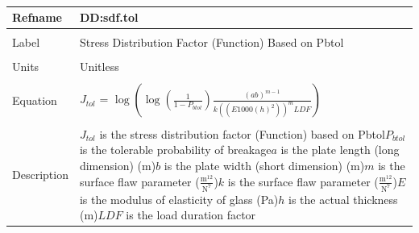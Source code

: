 \documentclass[12pt]{article}
\begin{document}
~\newline
\noindent \begin{minipage}{\textwidth}
\begin{tabular}{p{} p{}}
\toprule \textbf{Refname} & \textbf{DD:sdf.tol}
\label{DD:sdf.tol}
\\ \midrule \\
Label & Stress Distribution Factor (Function) Based on Pbtol
\\ \midrule \\
Units & Unitless
\\ \midrule \\
Equation & ${J_{tol}}$ = $\log\left(\log\left(\frac{1}{1-{P_{btol}}}\right) \frac{\left(a b\right)^{m-1}}{k \left(\left(E 1000 \left(h\right)^{2}\right)\right)^{m} LDF}\right)$
\\ \midrule \\
Description & ${J_{tol}}$ is the stress distribution factor (Function) based on Pbtol\newline${P_{btol}}$ is the tolerable probability of breakage\newline$a$ is the plate length (long dimension) (m)\newline$b$ is the plate width (short dimension) (m)\newline$m$ is the surface flaw parameter ($\frac{\text{m}^{12}}{\text{N}^{7}}$)\newline$k$ is the surface flaw parameter ($\frac{\text{m}^{12}}{\text{N}^{7}}$)\newline$E$ is the modulus of elasticity of glass (Pa)\newline$h$ is the actual thickness (m)\newline$LDF$ is the load duration factor
\\ \bottomrule \end{tabular}
\end{minipage}\\
\end{document}
